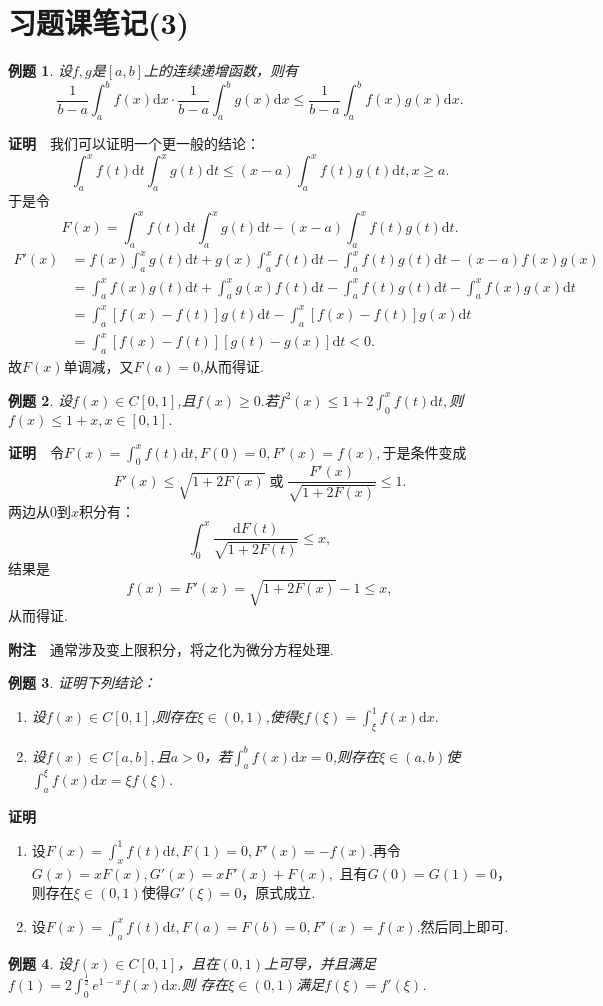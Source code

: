 \documentclass[UTF8]{article}
\newcommand{\dx}{\mathrm{d}x}
\newcommand{\zm}{\textbf{证明}$\quad$}
\newcommand{\fz}{\textbf{附注}$\quad$}
\newtheorem{exa}{\hspace{2em}例题}[section]
\begin{document}
\section{习题课笔记(3)}
\begin{exa}
  设$f,g$是$[a,b]$上的连续递增函数，则有
  $$\frac{1}{b-a}\int_a^bf(x)\dx\cdot\frac{1}{b-a}\int_a^bg(x)\dx\le\frac{1}{b-a}\int_a^bf(x)g(x)\dx.$$
\end{exa}
\zm 我们可以证明一个更一般的结论：
$$\int_a^xf(t)\mathrm{d}t\int_a^xg(t)\mathrm{d}t\le(x-a)\int_a^xf(t)g(t)\mathrm{d}t,x\ge a.$$
于是令$$F(x)=\int_a^xf(t)\mathrm{d}t\int_a^xg(t)\mathrm{d}t-(x-a)\int_a^xf(t)g(t)\mathrm{d}t.$$
\begin{align*}
  F'(x)&=f(x)\int_a^xg(t)\mathrm{d}t+g(x)\int_a^xf(t)\mathrm{d}t-\int_a^xf(t)g(t)\mathrm{d}t-(x-a)f(x)g(x)\\
  &=\int_a^xf(x)g(t)\mathrm{d}t+\int_a^xg(x)f(t)\mathrm{d}t-\int_a^xf(t)g(t)\mathrm{d}t-\int_a^xf(x)g(x)\mathrm{d}t\\
  &=\int_a^x[f(x)-f(t)]g(t)\mathrm{d}t-\int_a^x[f(x)-f(t)]g(x)\mathrm{d}t\\
  &=\int_a^x[f(x)-f(t)][g(t)-g(x)]\mathrm{d}t<0.
\end{align*}
故$F(x)$单调减，又$F(a)=0$,从而得证.
\begin{exa}
  设$f(x)\in C[0,1]$,且$f(x)\ge0.$若$f^2(x)\le1+2\displaystyle\int_0^xf(t)\mathrm{d}t,$则$f(x)\le1+x,x\in[0,1].$
\end{exa}
\zm 令$F(x)=\int_0^xf(t)\mathrm{d}t,F(0)=0,F'(x)=f(x),$于是条件变成
$$F'(x)\le\sqrt{1+2F(x)}\;\text{或}\;\frac{F'(x)}{\sqrt{1+2F(x)}}\le 1.$$
两边从$0$到$x$积分有：
$$\int_0^x\frac{\mathrm{d}F(t)}{\sqrt{1+2F(t)}}\le x,$$
结果是
$$f(x)=F'(x)=\sqrt{1+2F(x)}-1\le x,$$
从而得证.

\fz 通常涉及变上限积分，将之化为微分方程处理.
\begin{exa}
  证明下列结论：
  \begin{enumerate}
    \item 设$f(x)\in C[0,1]$,则存在$\xi\in(0,1)$,使得$\xi f(\xi)=\displaystyle\int_\xi^1f(x)\dx.$
    \item 设$f(x)\in C[a,b],$且$a>0$，若$\displaystyle\int_a^bf(x)\dx=0$,则存在$\xi\in(a,b)$使
    $\displaystyle\int_a^\xi f(x)\dx=\xi f(\xi).$
  \end{enumerate}
\end{exa}
\zm \begin{enumerate}
  \item 设$F(x)=\displaystyle\int_x^1f(t)\mathrm{d}t,F(1)=0,F'(x)=-f(x).$再令$G(x)=xF(x),G'(x)=xF'(x)+F(x),$
  且有$G(0)=G(1)=0$，则存在$\xi\in(0,1)$使得$G'(\xi)=0$，原式成立.
  \item 设$F(x)=\displaystyle\int_a^xf(t)\mathrm{d}t,F(a)=F(b)=0,F'(x)=f(x).$然后同上即可.
\end{enumerate}
\begin{exa}
  设$f(x)\in C[0,1]$，且在$(0,1)$上可导，并且满足$f(1)=2\displaystyle\int_0^\frac{1}{2}e^{1-x}f(x)\dx.$则
  存在$\xi\in(0,1)$满足$f(\xi)=f'(\xi)$.
\end{exa}
\end{document}
